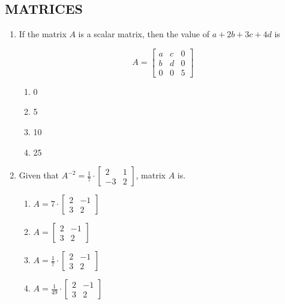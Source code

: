 \documentclass{article}
\begin{document}
\subsection*{MATRICES}
\date{} %

\begin{enumerate}[label=\textbf{\arabic*.}] %

    \item If the matrix \( A \) is a scalar matrix, then the value of \( a + 2b + 3c + 4d \) is

    \[
    A = \begin{bmatrix}
    a & c & 0 \\
    b & d & 0 \\
    0 & 0 & 5
    \end{bmatrix}
    \]

    \begin{enumerate}[label=\alph*)] %
        \item 0
        \item 5
        \item 10
        \item 25
    \end{enumerate}

    \item Given that \( A^{-2} = \frac{1}{7} \cdot \begin{bmatrix}
    2 & 1 \\
    -3 & 2
    \end{bmatrix} \), matrix \( A \) is.

    \begin{enumerate}[label=\alph*)] %
        \item \( A = 7 \cdot \begin{bmatrix}
        2 & -1 \\
        3 & 2
        \end{bmatrix} \)
        \item \( A = \begin{bmatrix}
        2 & -1 \\
        3 & 2
        \end{bmatrix} \)
        \item \( A = \frac{1}{7} \cdot \begin{bmatrix}
        2 & -1 \\
        3 & 2
        \end{bmatrix} \)
        \item \( A = \frac{1}{49} \cdot \begin{bmatrix}
        2 & -1 \\
        3 & 2
        \end{bmatrix} \)
    \end{enumerate}


\end{enumerate}
\end{document}
